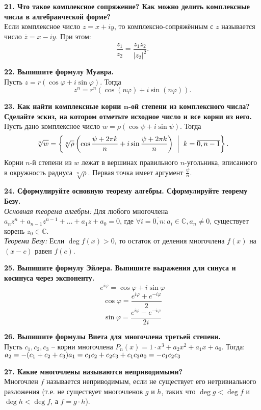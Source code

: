 \documentclass[11pt,a4paper]{article}
\renewcommand{\C}{\mathbb{C}}
\renewcommand{\mid}{\hspace{2mm}\middle|\hspace{2mm}}
\begin{document}
\textbf{21. Что такое комплексное сопряжение? Как можно делить комплексные числа в алгебраической форме?\\}
Если комплексное число $z = x + iy$, то комплексно-сопряжённым с $z$ называется число $\overline{z} = x - iy$. При этом: $$\frac{z_1}{z_2} = \frac{z_1 \overline{z_2} }{ \left\vert z_2 \right\vert ^2 }.$$

\textbf{22. Выпишите формулу Муавра.\\}
Пусть $z = r ( \cos \varphi + i \sin \varphi )$. Тогда $$z^n = r^n ( \cos (n \varphi) + i \sin (n \varphi) ).$$

\textbf{23. Как найти комплексные корни $\boldsymbol{n}$-ой степени из комплексного числа? Сделайте эскиз, на котором отметьте исходное число и все корни из него.\\}
Пусть дано комплексное число $w = \rho \left( \cos \psi + i \sin \psi \right)$. Тогда $$\sqrt[n]{w} = \left\{ \sqrt[n]{\rho} \left( \cos \frac{\psi + 2\pi k}{n} + i \sin \frac{\psi + 2\pi k}{n} \right) \mid k = \overline{0, n-1} \right\}.$$
Корни $n$-й степени из $w$ лежат в вершинах правильного $n$-угольника, вписанного в окружность радиуса $\sqrt[n]{\rho}$. Первая точка имеет аргумент $\frac{\psi}{n}$.

\textbf{24. Сформулируйте основную теорему алгебры. Сформулируйте теорему Безу.\\}
\textit{Основная теорема алгебры:} Для любого многочлена $a_n z^n + a_{n-1} z^{n-1} + \hdots + a_1 z + a_0 = 0$, где $\forall i = \overline{0, n}: a_i \in \C,  a_n \neq 0$, существует корень $z_0 \in \C$.\\
\textit{Теорема Безу:} Если $\deg f(x) > 0$, то остаток от деления многочлена $f(x)$ на $(x - c)$ равен $f(c)$.

\textbf{25. Выпишите формулу Эйлера. Выпишите выражения для синуса и косинуса через экспоненту.}
$$e^{i \varphi} = \cos \varphi + i \sin \varphi$$
$$\cos \varphi = \frac{e^{i \varphi} + e^{-i \varphi}}{2}$$
$$\sin \varphi = \frac{e^{i \varphi} - e^{-i \varphi}}{2i}$$
\pagebreak

\textbf{26. Выпишите формулы Виета для многочлена третьей степени.\\}
Пусть $c_1, c_2, c_3$ -- корни многочлена $P_n(x) = 1 \cdot x^3 + a_2 x^2 + a_1 x + a_0$. Тогда:\\
$a_2 = - ( c_1 + c_2 + c_3 ) \\
a_1 = c_1 c_2 + c_2 c_3 + c_1 c_3 \\
a_0 = - c_1 c_2 c_3$

\textbf{27. Какие многочлены называются неприводимыми?\\}
Многочлен $f$ называется неприводимым, если не существует его нетривиального разложения (т.е. не существует многочленов $g$ и $h$, таких что $\deg g < \deg f$ и $\deg h < \deg f$, а $f = g \cdot h$).
\end{document}
